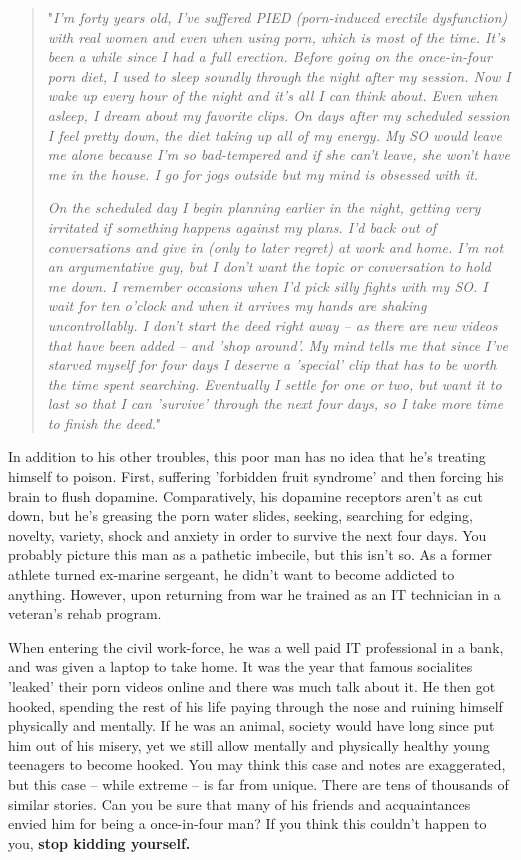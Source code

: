 \documentclass[
]{book}
\begin{document}
\begin{quote}
"\emph{I'm forty years old, I've suffered PIED (porn-induced erectile dysfunction) with real women and even when using porn, which is most of the time. It's been a while since I had a full erection. Before going on the once-in-four porn diet, I used to sleep soundly through the night after my session. Now I wake up every hour of the night and it's all I can think about. Even when asleep, I dream about my favorite clips. On days after my scheduled session I feel pretty down, the diet taking up all of my energy. My SO would leave me alone because I'm so bad-tempered and if she can't leave, she won't have me in the house. I go for jogs outside but my mind is obsessed with it.}

\emph{On the scheduled day I begin planning earlier in the night, getting very irritated if something happens against my plans. I'd back out of conversations and give in (only to later regret) at work and home. I'm not an argumentative guy, but I don't want the topic or conversation to hold me down. I remember occasions when I'd pick silly fights with my SO. I wait for ten o'clock and when it arrives my hands are shaking uncontrollably. I don't start the deed right away -- as there are new videos that have been added -- and 'shop around'. My mind tells me that since I've starved myself for four days I deserve a 'special' clip that has to be worth the time spent searching. Eventually I settle for one or two, but want it to last so that I can 'survive' through the next four days, so I take more time to finish the deed.}"
\end{quote}

In addition to his other troubles, this poor man has no idea that he's treating himself to poison. First, suffering 'forbidden fruit syndrome' and then forcing his brain to flush dopamine. Comparatively, his dopamine receptors aren't as cut down, but he's greasing the porn water slides, seeking, searching for edging, novelty, variety, shock and anxiety in order to survive the next four days. You probably picture this man as a pathetic imbecile, but this isn't so. As a former athlete turned ex-marine sergeant, he didn't want to become addicted to anything. However, upon returning from war he trained as an IT technician in a veteran's rehab program.

When entering the civil work-force, he was a well paid IT professional in a bank, and was given a laptop to take home. It was the year that famous socialites 'leaked' their porn videos online and there was much talk about it. He then got hooked, spending the rest of his life paying through the nose and ruining himself physically and mentally. If he was an animal, society would have long since put him out of his misery, yet we still allow mentally and physically healthy young teenagers to become hooked. You may think this case and notes are exaggerated, but this case -- while extreme -- is far from unique. There are tens of thousands of similar stories. Can you be sure that many of his friends and acquaintances envied him for being a once-in-four man? If you think this couldn't happen to you, \textbf{stop kidding yourself.}
\end{document}
